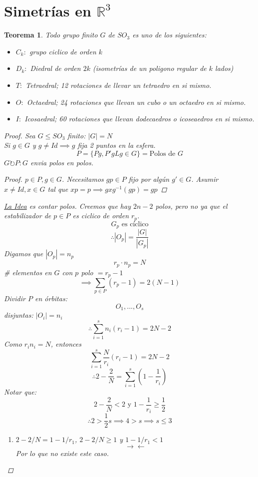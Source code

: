 \documentclass[11pt]{book}
\newcommand{\set}[1]{\mathbb{#1}}
\newcommand{\contr}{\rightarrow\leftarrow}
\newtheorem{thm}{Teorema}[section]
\theoremstyle{definition}
\begin{document}
\section{Simetrías en $\set{R}^3$}
\begin{thm}
	Todo grupo finito $G$ de $SO_3$ es uno de los siguientes:
	\begin{itemize}
		\item $C_k:$ grupo ciclico de orden $k$

		\item $D_k:$ Diedral de orden $2k$ (isometrías de un poligono regular de $k$ lados)

		\item $T:$ Tetraedral; 12 rotaciones de llevar un tetraedro en si mismo.

		\item $O:$ Octaedral; 24 rotaciones que llevan un cubo o un octaedro en si mismo.

		\item $I:$ Icosaedral; 60 rotaciones que llevan dodecaedros o icoseaedros en si mismo.
	\end{itemize}
	\begin{proof}
		Sea $G\leq SO_3$ finito: $|G|=N$\\
		Si $g\in G$ y $g\neq Id\implies g$ fija 2 puntos en la esfera.
		\[P=\{Pg,P'gLg\in G\}=\textrm{Polos de $G$}\]
		$G\circlearrowright P:G$ envia polos en polos.
		\begin{proof}
			$p\in P, g\in G$. Necesitamos $gp\in P$ fijo por algún $g'\in G$. Asumir $x\neq Id, x\in G$ tal que $xp=p\implies gxg^{-1}(gp)=gp$
		\end{proof}
		\underline{La Idea} es contar polos. 
		Creemos que hay $2n-2$ polos, pero no ya que el estabilizador de $p\in P$ es ciclico de orden $r_p$.
		\[G_p\textrm{ es cíclico}\]
		\[\therefore |O_p|=\frac{|G|}{|G_p|}\]
		Digamos que $|O_p| = n_p$
		\[r_p\cdot n_p=N\]
		\# elementos en $G$ con $p$ polo $=r_p-1$
		\[\implies\sum_{p\in P}(r_p-1)=2(N-1)\]
		Dividir $P$ en órbitas:
		\[O_1,...,O_s\]
		disjuntas: $|O_i|=n_i$
		\[\therefore\sum^s_{i=1}n_i(r_i-1)=2N-2\]
		Como $r_in_i=N$, entonces
		\[\sum^s_{i=1}\frac{N}{r_i}(r_i-1)=2N-2\]
		\[\therefore 2-\frac{2}{N}=\sum^s_{i=1}\left(1-\frac{1}{r_i}\right)\]
		Notar que:
		\[2-\frac{2}{N}<2\textrm{ y }1-\frac{1}{r_i}\geq \frac{1}{2}\]
		\[\therefore 2>\frac{1}{2}s\implies 4>s\implies s\leq 3\]
		\begin{enumerate}[label=(\arabic* órbitas):]
			\item $2-2/N=1-1/r_1$, $2-2/N\geq 1$ y $1-1/r_1<1$
			\[\contr\]
			Por lo que no existe este caso.
			

\end{enumerate}
\end{proof}
\end{thm}
\end{document}
